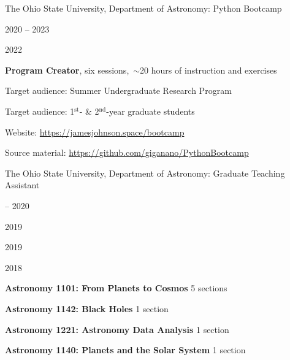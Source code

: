 \documentclass[cv.tex]{subfiles}
\begin{document}
{\color{themecolor} \large The Ohio State University, Department of Astronomy:
Python Bootcamp}
\par\noindent
\parbox{0.18\textwidth}{%
	\vspace{2mm}
	\raggedleft
	\null \par
	2020 -- 2023 \par
	2022 \par
	\null \par
	\null
}
\hspace{1mm}
\parbox{0.73\textwidth}{%
	\textbf{Program Creator}, six sessions,~$\sim$20 hours of instruction
	and exercises \par
	Target audience: Summer Undergraduate Research Program \par
	Target audience: 1$^\text{st}$- \& 2$^\text{nd}$-year graduate students \par
	Website: {\small \url{https://jamesjohnson.space/bootcamp}} \par
	Source material: 
	{\small \url{https://github.com/giganano/PythonBootcamp}}
}

\vspace{4mm}
\noindent
{\color{themecolor} \large The Ohio State University, Department of Astronomy:
Graduate Teaching Assistant}
\par\noindent
\parbox{0.18\textwidth}{%
	 -- 2020 \par
	2019 \par
	2019 \par
	2018
}
\hspace{1mm}
\parbox{0.8\textwidth}{%
	\vspace{1mm}
	\textbf{Astronomy 1101: From Planets to Cosmos} \hfill 5 sections \par
	\textbf{Astronomy 1142: Black Holes} \hfill 1 section \par
	\textbf{Astronomy 1221: Astronomy Data Analysis} \hfill 1 section \par
	\textbf{Astronomy 1140: Planets and the Solar System} \hfill 1 section \par
}
\end{document}
